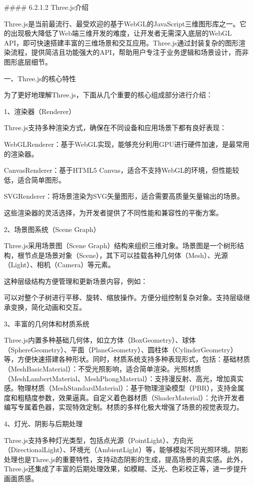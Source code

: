\#\#\#\# 6.2.1.2 Three.js介绍

Three.js是当前最流行、最受欢迎的基于WebGL的JavaScript三维图形库之一。它的出现极大降低了Web端三维开发的难度，让开发者无需深入底层的WebGL API，即可快速搭建丰富的三维场景和交互应用。Three.js通过封装复杂的图形渲染流程，提供简洁且功能强大的API，帮助用户专注于业务逻辑和场景设计，而非图形底层细节。

一、Three.js的核心特性

为了更好地理解Three.js，下面从几个重要的核心组成部分进行介绍：

1、渲染器（Renderer）

Three.js支持多种渲染方式，确保在不同设备和应用场景下都有良好表现：

WebGLRenderer：基于WebGL实现，能够充分利用GPU进行硬件加速，是最常用的渲染器。

CanvasRenderer：基于HTML5 Canvas，适合不支持WebGL的环境，但性能较低，适合简单图形。

SVGRenderer：将场景渲染为SVG矢量图形，适合需要高质量矢量输出的场景。

这些渲染器的灵活选择，为开发者提供了不同性能和兼容性的平衡方案。

2、场景图系统（Scene Graph）

Three.js采用场景图（Scene Graph）结构来组织三维对象。场景图是一个树形结构，根节点是场景对象（Scene），其下可以挂载各种几何体（Mesh）、光源（Light）、相机（Camera）等元素。

这种层级结构方便管理和更新场景内容，例如：

可以对整个子树进行平移、旋转、缩放操作。方便分组控制复杂对象。支持层级继承变换，简化动画和交互。

3、丰富的几何体和材质系统

Three.js内置多种基础几何体，如立方体（BoxGeometry）、球体（SphereGeometry）、平面（PlaneGeometry）、圆柱体（CylinderGeometry）等，方便快速搭建各种形状。同时，材质系统支持多种表现形式，包括：基础材质（MeshBasicMaterial）：不受光照影响，适合简单渲染。光照材质（MeshLambertMaterial、MeshPhongMaterial）：支持漫反射、高光，增加真实感。物理材质（MeshStandardMaterial）：基于物理渲染模型（PBR），支持金属度和粗糙度参数，效果逼真。自定义着色器材质（ShaderMaterial）：允许开发者编写专属着色器，实现特效定制。材质的多样化极大增强了场景的视觉表现力。

4、灯光、阴影与后期处理

Three.js支持多种灯光类型，包括点光源（PointLight）、方向光（DirectionalLight）、环境光（AmbientLight）等，能够模拟不同光照环境。阴影处理也是Three.js的重要特性，支持动态阴影的生成，提高场景的真实感。此外，Three.js还集成了丰富的后期处理效果，如模糊、泛光、色彩校正等，进一步提升画面质感。

